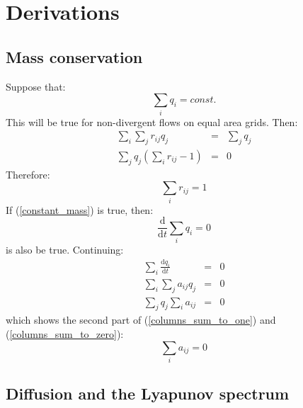 \section{Derivations}

\subsection{Mass conservation}

\label{mass_conservation_derivation}

Suppose that:
\begin{equation}
	\sum_i q_i = const.
	\label{constant_mass}
\end{equation}
This will be true for non-divergent flows on equal area grids.
Then:
\begin{eqnarray}
	\sum_i \sum_j r_{ij} q_j & = & \sum_j q_j \\
	\sum_j q_j \left ( \sum_i r_{ij} - 1 \right ) & = & 0
\end{eqnarray}
Therefore:
\begin{equation}
	\sum_i r_{ij} = 1
\end{equation}
If (\ref{constant_mass}) is true, then:
\begin{equation}
	\frac{\mathrm d}{\mathrm d t}\sum_i q_i = 0
\end{equation}
is also be true. Continuing:
\begin{eqnarray}
	\sum_i \frac{\mathrm d q_i}{\mathrm d t} & = & 0 \\
\sum_i \sum_j a_{ij} q_j & = & 0 \\
\sum_j q_j \sum_i a_{ij} & = & 0
\end{eqnarray}
which shows the second part of (\ref{columns_sum_to_one}) and 
(\ref{columns_sum_to_zero}):
\begin{equation}
	\sum_i a_{ij} = 0
\end{equation}

\subsection{Diffusion and the Lyapunov spectrum}

\label{Lyapunov_exponents_less_than_zero}

